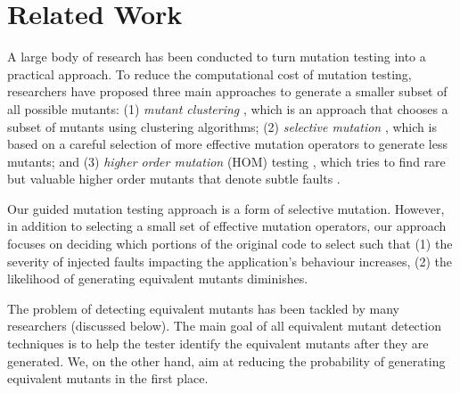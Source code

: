 \section{Related Work} \label{Sec:related}
A large body of research has been conducted to turn mutation testing into a practical  approach.
To reduce the computational cost of  mutation testing, researchers have
proposed three main approaches to generate a smaller subset of all possible mutants: 
(1) \emph{mutant clustering} \cite{ji:seke09}, which is an approach that chooses a subset of
mutants using clustering algorithms; (2)  \emph{selective mutation} \cite{barbosa:stvr01, siami:icse08, zhang:icse10}, which is based on a  
careful selection of more effective mutation operators to generate less mutants; and 
 (3) \emph{higher order mutation} (HOM) testing \cite{jia:scam08}, which tries to find 
rare but valuable higher order mutants that denote subtle faults \cite{jia:tse10}. 

Our guided mutation testing approach is a form of selective mutation. However, in addition to selecting a small set of effective mutation operators, our  approach focuses on deciding which portions of the original code to select such that (1) the severity of  injected faults impacting  the application's behaviour increases, (2) the likelihood of generating equivalent mutants diminishes. 

The problem of detecting equivalent mutants has been tackled by many researchers (discussed below). The main goal of all equivalent mutant detection techniques is to help the tester identify the equivalent mutants after they are generated. We, on the other hand, aim at reducing the probability of generating equivalent mutants in the first place.

